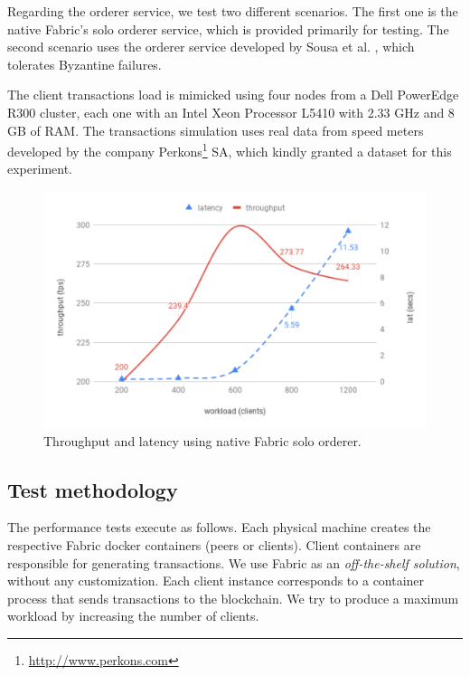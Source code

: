 \documentclass[journal]{IEEEtran}
\begin{document}
Regarding the orderer service, we test two different scenarios.
The first one is the native Fabric's solo orderer service, which is provided primarily for testing.
The second scenario uses the orderer service developed by Sousa et al. \cite{Sousa2018}, which tolerates Byzantine failures.

The client transactions load is mimicked using four nodes from a Dell PowerEdge R300 cluster, each one with an Intel Xeon Processor L5410 with 2.33 GHz and 8 GB of RAM.
The transactions simulation uses real data from speed meters developed by the company Perkons\footnote{\url{http://www.perkons.com}} SA, which kindly granted a dataset for this experiment.

\begin{figure}[!t]
\centering
\includegraphics[width=.45\textwidth]{chartsolo} %
\caption{Throughput and latency using native Fabric solo orderer.}
\label{f:latth}
\end{figure}

\subsection{Test methodology}
The performance tests execute as follows.
Each physical machine creates the respective Fabric docker containers (peers or clients).
Client containers are responsible for generating transactions.
We use Fabric as an \emph{off-the-shelf solution}, without any customization.
Each client instance corresponds to a container process that sends transactions to the blockchain.
We try to produce a maximum workload by increasing the number of clients.

\end{document}
